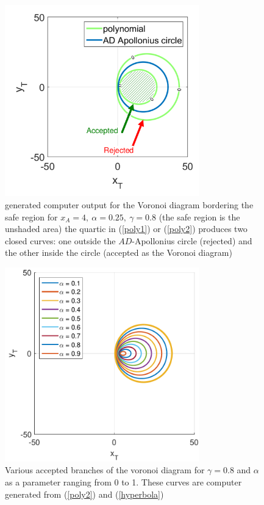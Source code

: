 \begin{figure}[htb]
\centering
\includegraphics[width=0.75\textwidth]{fig/marked_circle_curve_g_0p8.pdf}
\caption{generated computer output for the Voronoi diagram bordering the safe region for $x_A=4,\ \alpha=0.25,\ \gamma=0.8$ (the safe region is the unshaded area) the quartic in (\ref{poly1}) or (\ref{poly2}) produces two closed curves: one outside the $AD$-Apollonius circle (rejected) and the other inside the circle (accepted as the Voronoi diagram)}
\label{gamma=0.8}
\end{figure}


\begin{figure}[htb]
\centering
\includegraphics[width=0.75\textwidth]{fig/VAR_alpha_g_0p8.pdf}
\caption{Various accepted branches of the voronoi diagram for $\gamma=0.8$ and $\alpha$ as a parameter ranging from 0 to 1. These curves are computer generated from (\ref{poly2}) and (\ref{hyperbola})}
\label{VAR_alpha_gamma=0.8}
\end{figure}



